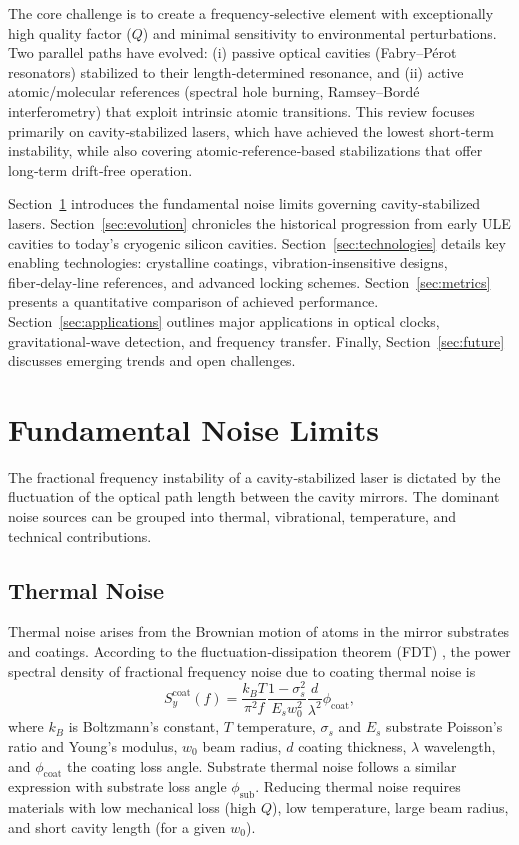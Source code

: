 \documentclass[12pt,a4paper]{article}
\begin{document}
The core challenge is to create a frequency‑selective element with exceptionally high quality factor ($Q$) and minimal sensitivity to environmental perturbations. Two parallel paths have evolved: (i) passive optical cavities (Fabry–Pérot resonators) stabilized to their length‑determined resonance, and (ii) active atomic/molecular references (spectral hole burning, Ramsey–Bordé interferometry) that exploit intrinsic atomic transitions. This review focuses primarily on cavity‑stabilized lasers, which have achieved the lowest short‑term instability, while also covering atomic‑reference‑based stabilizations that offer long‑term drift‑free operation.

Section~\ref{sec:noise} introduces the fundamental noise limits governing cavity‑stabilized lasers. Section~\ref{sec:evolution} chronicles the historical progression from early ULE cavities to today's cryogenic silicon cavities. Section~\ref{sec:technologies} details key enabling technologies: crystalline coatings, vibration‑insensitive designs, fiber‑delay‑line references, and advanced locking schemes. Section~\ref{sec:metrics} presents a quantitative comparison of achieved performance. Section~\ref{sec:applications} outlines major applications in optical clocks, gravitational‑wave detection, and frequency transfer. Finally, Section~\ref{sec:future} discusses emerging trends and open challenges.

\section{Fundamental Noise Limits}\label{sec:noise}
The fractional frequency instability of a cavity‑stabilized laser is dictated by the fluctuation of the optical path length between the cavity mirrors. The dominant noise sources can be grouped into thermal, vibrational, temperature, and technical contributions.

\subsection{Thermal Noise}
Thermal noise arises from the Brownian motion of atoms in the mirror substrates and coatings. According to the fluctuation‑dissipation theorem (FDT) \cite{numata2004}, the power spectral density of fractional frequency noise due to coating thermal noise is
\begin{equation}
S_y^{\mathrm{coat}}(f) = \frac{k_B T}{\pi^2 f} \frac{1 - \sigma_s^2}{E_s w_0^2} \frac{d}{\lambda^2} \phi_{\mathrm{coat}},
\end{equation}
where $k_B$ is Boltzmann's constant, $T$ temperature, $\sigma_s$ and $E_s$ substrate Poisson's ratio and Young's modulus, $w_0$ beam radius, $d$ coating thickness, $\lambda$ wavelength, and $\phi_{\mathrm{coat}}$ the coating loss angle. Substrate thermal noise follows a similar expression with substrate loss angle $\phi_{\mathrm{sub}}$. Reducing thermal noise requires materials with low mechanical loss (high $Q$), low temperature, large beam radius, and short cavity length (for a given $w_0$).
\end{document}
